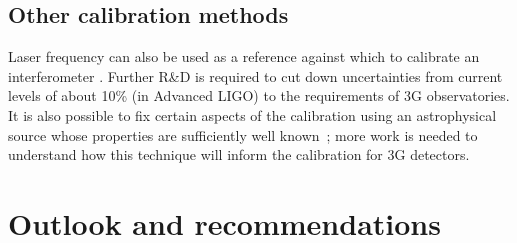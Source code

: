 \subsection{Other calibration methods}
Laser frequency can also be used as a reference against which to calibrate an interferometer \cite{Leong2012, PhysRevD.95.062003}. Further R\&D is required to cut down uncertainties from current levels of about 10\% (in Advanced LIGO) to the requirements of 3G observatories.
It is also possible to fix certain aspects of the calibration using an astrophysical source whose properties are sufficiently well known~\cite{CalibrationGW170817,Pitkin:2015kgm}; more work is needed to understand how this technique will inform the calibration for 3G detectors.


\section{Outlook and recommendations}

